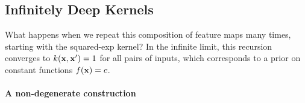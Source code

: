 \subsection{Infinitely Deep Kernels}
What happens when we repeat this composition of feature maps many times, starting with the squared-exp kernel?  In the infinite limit, this recursion converges to $k({\bf{x}},{\bf{x}}') = 1$ for all pairs of inputs, which corresponds to a prior on constant functions $f({\bf{x}}) = c$.

%

\paragraph{A non-degenerate construction}

